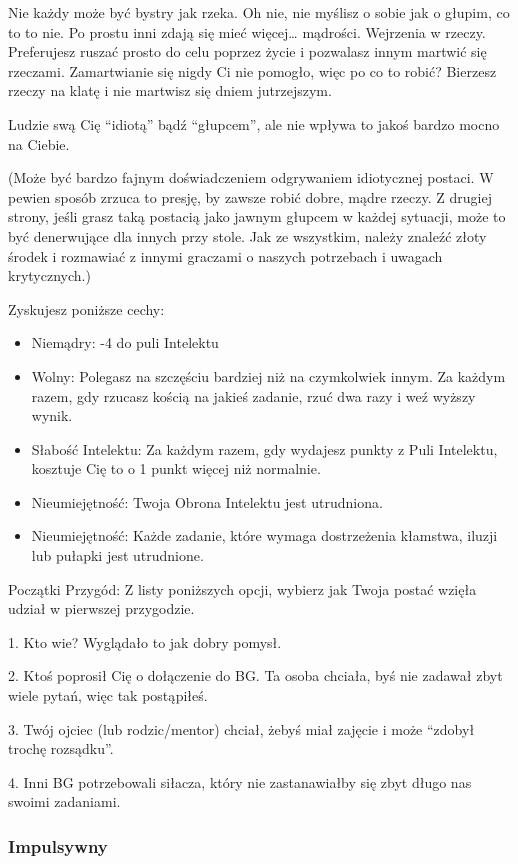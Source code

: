 Nie każdy może być bystry jak rzeka.  Oh nie, nie myślisz o sobie jak o głupim, co to to nie. Po prostu inni zdają się mieć więcej… mądrości. Wejrzenia w rzeczy. Preferujesz ruszać prosto do celu poprzez życie i pozwalasz innym martwić się rzeczami. Zamartwianie się nigdy Ci nie pomogło, więc po co to robić? Bierzesz rzeczy na klatę i nie martwisz się dniem jutrzejszym.

Ludzie swą Cię “idiotą” bądź “głupcem”, ale nie wpływa to jakoś bardzo mocno na Ciebie. 

(Może być bardzo fajnym doświadczeniem odgrywaniem idiotycznej postaci. W pewien sposób zrzuca to presję, by zawsze robić dobre, mądre rzeczy. Z drugiej strony, jeśli grasz taką postacią jako jawnym głupcem w każdej sytuacji, może to być denerwujące dla innych przy stole. Jak ze wszystkim, należy znaleźć złoty środek i rozmawiać z innymi graczami o naszych potrzebach i uwagach krytycznych.)

Zyskujesz poniższe cechy:
\begin{itemize} 
\item Niemądry: -4 do puli Intelektu
\item Wolny: Polegasz na szczęściu bardziej niż na czymkolwiek innym. Za każdym razem, gdy rzucasz kością na jakieś zadanie, rzuć dwa razy i weź wyższy wynik.
\item  Słabość Intelektu: Za każdym razem, gdy wydajesz punkty z Puli Intelektu, kosztuje Cię to o 1 punkt więcej niż normalnie.
\item Nieumiejętność: Twoja Obrona Intelektu jest utrudniona.
\item Nieumiejętność: Każde zadanie, które wymaga dostrzeżenia kłamstwa, iluzji lub pułapki jest utrudnione.
\end{itemize}

Początki Przygód: Z listy poniższych opcji, wybierz jak Twoja postać wzięła udział w pierwszej przygodzie.

1. Kto wie? Wyglądało to jak dobry pomysł.

2. Ktoś poprosił Cię o dołączenie do BG. Ta osoba chciała, byś nie zadawał zbyt wiele pytań, więc tak postąpiłeś.

3. Twój ojciec (lub rodzic/mentor) chciał, żebyś miał zajęcie i może “zdobył trochę rozsądku”.

4. Inni BG potrzebowali siłacza, który nie zastanawiałby się zbyt długo nas swoimi zadaniami.

\subsubsection{Impulsywny}

